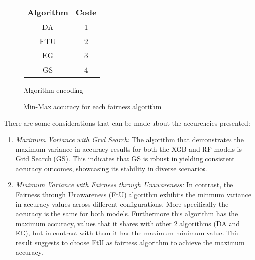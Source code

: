 \begin{figure}[H]
    \centering
    \begin{tabular}{|c|c|}
        \hline
        \textbf{Algorithm} & \textbf{Code} \\
        \hline
        DA & 1 \\
        \hline
        FTU & 2 \\
        \hline
        EG & 3 \\
        \hline
        GS & 4 \\
        \hline
    \end{tabular}
    \caption{Algorithm encoding}
\end{figure}

\begin{figure}[H]
    \centering
    \caption{Min-Max accuracy for each fairness algorithm}
\end{figure}

There are some considerations that can be made about the accurencies presented:
\begin{enumerate}

    \item \emph{Maximum Variance with Grid Search:} The algorithm that demonstrates the maximum variance in accuracy results for both the XGB and RF models is Grid Search (GS). This indicates that GS is robust in yielding consistent accuracy outcomes, showcasing its stability in diverse scenarios.

    \item \emph{Minimum Variance with Fairness through Unawareness:} In contrast, the Fairness through Unawareness (FtU) algorithm exhibits the minmum variance in accuracy values across different configurations. More specifically the accuracy is the same for both models. Furthermore this algorithm has the maximum accuracy, values that it shares with other 2 algorithms (DA and EG), but in contrast with them it has the maximum minimum value. This result suggests to choose FtU as fairness algorithm to achieve the maximum accuracy.
\end{enumerate}

